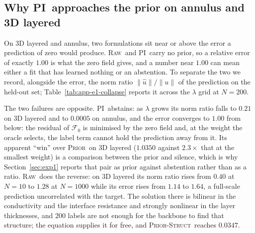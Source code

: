 \documentclass{article}
\newcommand{\armraw}{\textsc{Raw}}
\newcommand{\armpi}{\textsc{PI}}
\newcommand{\armprior}{\textsc{Prior}}
\newcommand{\armstruct}{\textsc{Prior-Struct}}
\begin{document}
\subsection{Why \armpi\ approaches the prior on annulus and 3D layered}
\label{app:pi-collapse}

On 3D layered and annulus, two formulations sit near or above the error a prediction of zero
would produce. \armraw\ and \armpi\ carry no prior, so a relative error of exactly $1.00$ is
what the zero field gives, and a number near $1.00$ can mean either a fit that has learned nothing
or an abstention. To separate the two we record, alongside the error, the norm ratio
$\|\hat u\|/\|u\|$ of the prediction on the held-out set; Table~\ref{tab:app-e1-collapse}
reports it across the $\lambda$ grid at $N=200$.

The two failures are opposite. \armpi\ abstains: as $\lambda$ grows its norm ratio falls to
$0.21$ on 3D layered and to $0.0005$ on annulus, and the error converges to $1.00$ from below: the
residual of $\mathcal{F}_0$ is minimised by the zero field and, at the weight the oracle selects,
the label term cannot hold the prediction away from it. Its apparent ``win'' over \armprior\ on
3D layered ($1.0350$ against $2.3\times$ that at the smallest weight) is a comparison between the
prior and silence, which is why Section~\ref{sec:exp1} reports that pair as prior against
abstention rather than as a ratio. \armraw\ does the reverse: on 3D layered its norm ratio rises
from $0.40$ at $N{=}10$ to $1.28$ at $N{=}1000$ while its error rises from $1.14$ to $1.64$, a
full-scale prediction uncorrelated with the target. The solution there is bilinear in the
conductivity and the interface resistance and strongly nonlinear in the layer thicknesses, and
$200$ labels are not enough for the backbone to find that structure; the equation supplies it for
free, and \armstruct\ reaches $0.0347$.
\end{document}
